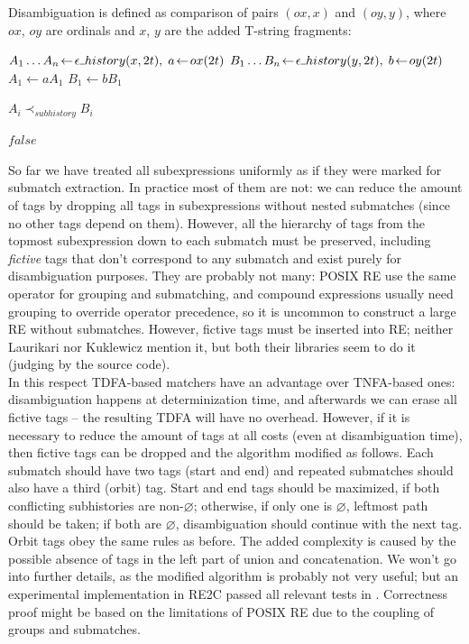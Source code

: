 \documentclass{article}
\newcommand{\Xset}{\!\leftarrow\!}
\newcommand{\Xund}{\rule{.4em}{.4pt}} %
\newcommand{\Xeq}{\!=\!}
\theoremstyle{definition}
\begin{document}
\begin{multicols}{2}
Disambiguation is defined as comparison of pairs $(ox, x)$ and $(oy, y)$,
where $ox$, $oy$ are ordinals and $x$, $y$ are the added T-string fragments:
\\

    \begin{algorithm}[H] \DontPrintSemicolon {} 
     {
        \For {$t \Xeq \overline{1, N}$} {
            $A_1 \dots A_n \Xset \epsilon \Xund history(x, 2t), \; a \Xset ox(2t)$ \;
            $B_1 \dots B_n \Xset \epsilon \Xund history(y, 2t), \; b \Xset oy(2t)$ \;
            $A_1 \Xset a A_1$ \;
            $B_1 \Xset b B_1$ \;

            \For {$i \Xeq \overline{1, n}$} {
                 {\Return $A_i \prec_{subhistory} B_i$}
            }
        }
        \Return $false$ \;
    }
    \end{algorithm}

So far we have treated all subexpressions uniformly as if they were marked for submatch extraction.
In practice most of them are not: we can reduce the amount of tags by dropping all tags in subexpressions without nested submatches
(since no other tags depend on them).
However, all the hierarchy of tags from the topmost subexpression down to each submatch must be preserved,
including \emph{fictive} tags that don't correspond to any submatch and exist purely for disambiguation purposes.
They are probably not many: POSIX RE use the same operator for grouping and submatching,
and compound expressions usually need grouping to override operator precedence,
so it is uncommon to construct a large RE without submatches.
However, fictive tags must be inserted into RE; neither Laurikari nor Kuklewicz mention it,
but both their libraries seem to do it (judging by the source code).
\\

In this respect TDFA-based matchers have an advantage over TNFA-based ones:
disambiguation happens at determinization time,
and afterwards we can erase all fictive tags -- the resulting TDFA will have no overhead.
However, if it is necessary to reduce the amount of tags at all costs (even at disambiguation time),
then fictive tags can be dropped and the algorithm modified as follows.
Each submatch should have two tags (start and end)
and repeated submatches should also have a third (orbit) tag.
Start and end tags should be maximized, if both conflicting subhistories are non-$\varnothing$;
otherwise, if only one is $\varnothing$, leftmost path should be taken;
if both are $\varnothing$, disambiguation should continue with the next tag.
Orbit tags obey the same rules as before.
The added complexity is caused by the possible absence of tags in the left part of union and concatenation.
We won't go into further details, as the modified algorithm is probably not very useful;
but an experimental implementation in RE2C passed all relevant tests in \cite{Fow03}.
Correctness proof might be based on the limitations of POSIX RE due to the coupling of groups and submatches.


\end{multicols}
\end{document}

